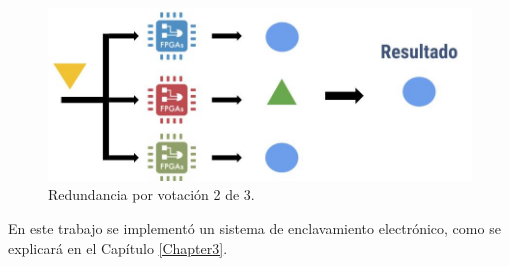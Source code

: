 			\begin{figure}[h]
				\centering
				\includegraphics[scale=.45]{./Figures/Redundancia}
				\caption{Redundancia por votación 2 de 3.}
				\label{fig:Redundancia}
			\end{figure}
			
			En este trabajo se implementó un sistema de enclavamiento electrónico, como se explicará en el Capítulo \ref{Chapter3}.
	 
	 		
